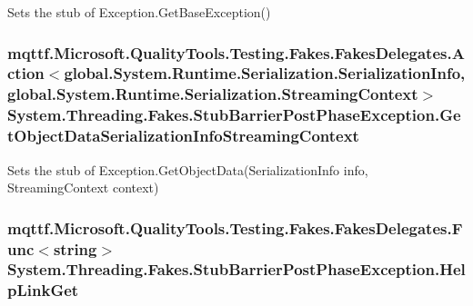 Sets the stub of Exception.\-Get\-Base\-Exception()

\hypertarget{class_system_1_1_threading_1_1_fakes_1_1_stub_barrier_post_phase_exception_a8073933b91363f4a223f1084b8ccefd9}{
\subsubsection[{Get\-Object\-Data\-Serialization\-Info\-Streaming\-Context}]{\setlength{\rightskip}{0pt plus 5cm}mqttf.\-Microsoft.\-Quality\-Tools.\-Testing.\-Fakes.\-Fakes\-Delegates.\-Action$<$global.\-System.\-Runtime.\-Serialization.\-Serialization\-Info, global.\-System.\-Runtime.\-Serialization.\-Streaming\-Context$>$ System.\-Threading.\-Fakes.\-Stub\-Barrier\-Post\-Phase\-Exception.\-Get\-Object\-Data\-Serialization\-Info\-Streaming\-Context}}\label{class_system_1_1_threading_1_1_fakes_1_1_stub_barrier_post_phase_exception_a8073933b91363f4a223f1084b8ccefd9}


Sets the stub of Exception.\-Get\-Object\-Data(\-Serialization\-Info info, Streaming\-Context context)

\hypertarget{class_system_1_1_threading_1_1_fakes_1_1_stub_barrier_post_phase_exception_aa74e953869e193dfc1420a293886b9cb}{
\subsubsection[{Help\-Link\-Get}]{\setlength{\rightskip}{0pt plus 5cm}mqttf.\-Microsoft.\-Quality\-Tools.\-Testing.\-Fakes.\-Fakes\-Delegates.\-Func$<$string$>$ System.\-Threading.\-Fakes.\-Stub\-Barrier\-Post\-Phase\-Exception.\-Help\-Link\-Get}}\label{class_system_1_1_threading_1_1_fakes_1_1_stub_barrier_post_phase_exception_aa74e953869e193dfc1420a293886b9cb}


